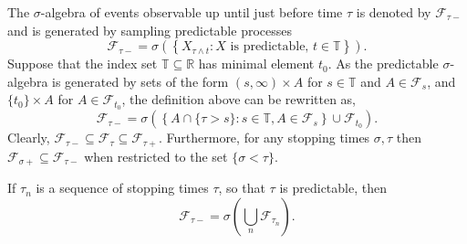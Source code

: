 \documentclass[12pt]{article}
\begin{document}
The $\sigma$-algebra of events observable up until just before time $\tau$ is denoted by $\mathcal{F}_{\tau-}$ and is generated by sampling predictable processes
\begin{equation*}
\mathcal{F}_{\tau-} = \sigma\left(\left\{X_{\tau\wedge t}: X\textrm{ is predictable, }t\in\mathbb{T}\right\}\right).
\end{equation*}
Suppose that the index set $\mathbb{T}\subseteq\mathbb{R}$ has minimal element $t_0$.
As the predictable $\sigma$-algebra is generated by sets of the form $(s,\infty)\times A$ for $s\in\mathbb{T}$ and $A\in \mathcal{F}_s$, and $\{t_0\}\times A$ for $A\in\mathcal{F}_{t_0}$, the definition above can be rewritten as,
\begin{equation*}
\mathcal{F}_{\tau-} = \sigma\left(\left\{A\cap\{\tau>s\}:s\in\mathbb{T},A\in\mathcal{F}_s\right\}\cup\mathcal{F}_{t_0}\right).
\end{equation*}
Clearly, $\mathcal{F}_{\tau-}\subseteq\mathcal{F}_\tau\subseteq\mathcal{F}_{\tau+}$. Furthermore, for any stopping times $\sigma,\tau$ then $\mathcal{F}_{\sigma+}\subseteq\mathcal{F}_{\tau-}$ when restricted to the set $\{\sigma<\tau\}$.

If $\tau_n$ is a sequence of stopping times  $\tau$, so that $\tau$ is predictable, then
\begin{equation*}
\mathcal{F}_{\tau-}=\sigma\left(\bigcup_n\mathcal{F}_{\tau_n}\right).
\end{equation*}

\end{document}
